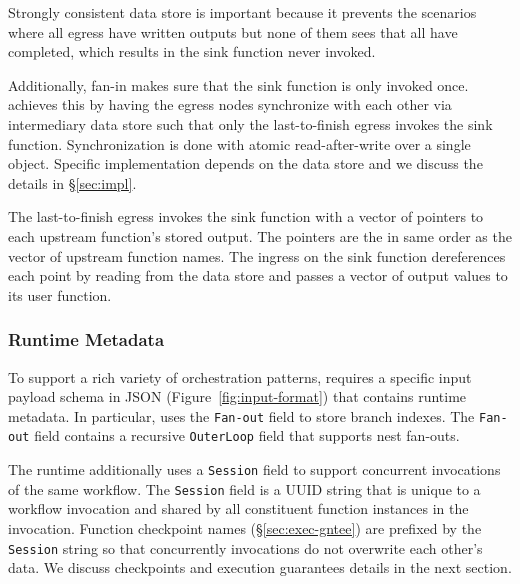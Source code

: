 Strongly consistent data store is important because it prevents the
scenarios where all egress have written outputs but none of them sees that all
have completed, which results in the sink function never invoked.

Additionally, fan-in makes sure that the sink function is only invoked once.
\name{} achieves this by having the egress nodes synchronize with each other
via intermediary data store such that only the last-to-finish egress invokes
the sink function. Synchronization is done with atomic read-after-write over a
single object. Specific implementation depends on the data store and we
discuss the details in \S\ref{sec:impl}.

The last-to-finish egress invokes the sink function with a vector of pointers
to each upstream function's stored output. The pointers are the in same order
as the vector of upstream function names. The ingress on the sink function
dereferences each point by reading from the data store and passes a vector of
output values to its user function.


\subsubsection{Runtime Metadata}

To support a rich variety of orchestration patterns, \name{} requires a
specific input payload schema in JSON (Figure~\ref{fig:input-format}) that
contains \name{} runtime metadata. In particular, \name{} uses the
\texttt{Fan-out} field to store branch indexes. The \texttt{Fan-out} field
contains a recursive \texttt{OuterLoop} field that supports nest fan-outs.

The runtime additionally uses a \texttt{Session} field to support concurrent
invocations of the same workflow. The \texttt{Session} field is a UUID string
that is unique to a workflow invocation and shared by all constituent function
instances in the invocation. Function checkpoint names
(\S\ref{sec:exec-gntee}) are prefixed by the \texttt{Session} string so that
concurrently invocations do not overwrite each other's data. We discuss
\name{} checkpoints and execution guarantees details in the next section.